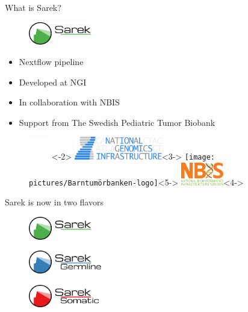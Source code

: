 \documentclass{beamer}
\begin{document}
\begin{frame}{What is Sarek?}
	\begin{figure}[t]
		\includegraphics[height=1cm]{pictures/Sarek_no_border}
	\end{figure}
	\begin{itemize}
		\pause
		\item Nextflow pipeline
		\item<3-> Developed at NGI
		\item<4-> In collaboration with NBIS
		\item<5-> Support from The Swedish Pediatric Tumor Biobank
	\end{itemize}
	\begin{figure}
		\includegraphics[height=1cm]{pictures/blank}<-2>
		\includegraphics[height=1cm]{pictures/NGI}<3->
		\only<3->{\hfill}
		\texttt{[image: pictures/Barntumörbanken-logo]}<5->
		\only<4->{\hfill}
		\includegraphics[height=1cm]{pictures/NBIS}<4->
	\end{figure}
	\vfill
\end{frame}

\begin{frame}{Sarek is now in two flavors}
	\begin{figure}
		\includegraphics[height=1cm]{pictures/Sarek}
	\end{figure}
	\pause
	\begin{figure}
		\includegraphics[height=1cm]{pictures/Sarek_germline}
	\end{figure}
	\begin{figure}
		\includegraphics[height=1cm]{pictures/Sarek_somatic}
	\end{figure}
\end{frame}
\end{document}
